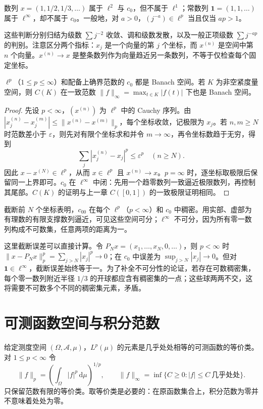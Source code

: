 \documentclass[UTF8,12pt,a4paper,fontset=fandol]{ctexbook}
\begin{document}
\begin{example}[一个空间中的点本身也可以是数列]
数列 $x=(1,1/2,1/3,\ldots)$ 属于 $\ell^2$ 与 $c_0$，但不属于 $\ell^1$；常数列 $\boldsymbol 1=(1,1,\ldots)$ 属于 $\ell^\infty$，却不属于 $c_0$。一般地，对 $a>0$，$(j^{-a})\in\ell^p$ 当且仅当 $ap>1$。
\end{example}
\begin{solve}
这些判断分别归结为级数 $\sum j^{-2}$ 收敛、调和级数发散，以及一般正项级数 $\sum j^{-ap}$ 的判别。注意区分两个指标：$x_j$ 是一个向量的第 $j$ 个坐标，而 $x^{(n)}$ 是空间中第 $n$ 个向量。$x^{(n)}\to x$ 是整条数列作为向量趋近另一条数列，不等于仅检查每个固定坐标。
\end{solve}

\begin{proposition}\label{prop:fa-sequence-complete}
$\ell^p$（$1\leq p\leq\infty$）和配备上确界范数的 $c_0$ 都是 Banach 空间。若 $K$ 为非空紧度量空间，则 $C(K)$ 在一致范数 $\|f\|_\infty=\max_{t\in K}|f(t)|$ 下也是 Banach 空间。
\end{proposition}
\begin{proof}
先设 $p<\infty$，$(x^{(n)})$ 为 $\ell^p$ 中的 Cauchy 序列。由 $|x_j^{(n)}-x_j^{(m)}|\leq\|x^{(n)}-x^{(m)}\|_p$，每个坐标收敛，记极限为 $x_j$。若 $n,m\geq N$ 时范数差小于 $\varepsilon$，则先对有限个坐标求和并令 $m\to\infty$，再令坐标数趋于无穷，得到
\[
 \sum_j|x_j^{(n)}-x_j|^p\leq\varepsilon^p\quad(n\geq N).
\]
因此 $x-x^{(N)}\in\ell^p$，从而 $x\in\ell^p$ 且 $x^{(n)}\to x$。$p=\infty$ 时，逐坐标取极限后保留同一上界即可。$c_0$ 在 $\ell^\infty$ 中闭：先用一个趋零数列一致逼近极限数列，再控制其尾部。$C(K)$ 的证明与上一章 $C([0,1])$ 的一致极限证明相同。
\end{proof}
截断前 $N$ 个坐标表明，$c_{00}$ 在每个 $\ell^p$（$p<\infty$）和 $c_0$ 中稠密。用实部、虚部为有理数的有限支撑数列逼近，可见这些空间可分；$\ell^\infty$ 不可分，因为所有零一数列构成不可数集，任意两项的距离为一。

这里截断误差可以直接计算。令 $P_Nx=(x_1,\ldots,x_N,0,\ldots)$，则 $p<\infty$ 时 $\|x-P_Nx\|_p^p=\sum_{j>N}|x_j|^p\to0$；在 $c_0$ 中误差为 $\sup_{j>N}|x_j|\to0$。但对 $\boldsymbol1\in\ell^\infty$，截断误差始终等于一。为了补全不可分性的论证，若存在可数稠密集，每个零一数列附近半径 $1/3$ 的开球都应含有稠密集的一点；这些球两两不交，这将需要不可数多个不同的稠密集元素，矛盾。

\section{可测函数空间与积分范数}
给定测度空间 $(\Omega,\mathcal A,\mu)$，$L^p(\mu)$ 的元素是几乎处处相等的可测函数的等价类。对 $1\leq p<\infty$ 令
\[
 \|f\|_p=\left(\int_\Omega|f|^p\,\mathrm d\mu\right)^{1/p},
 \qquad
 \|f\|_\infty=\inf\{C\geq0:|f|\leq C\ \text{几乎处处}\}.
\]
只保留范数有限的等价类。取等价类是必要的：在原函数集合上，积分范数为零并不意味着处处为零。
\end{document}
